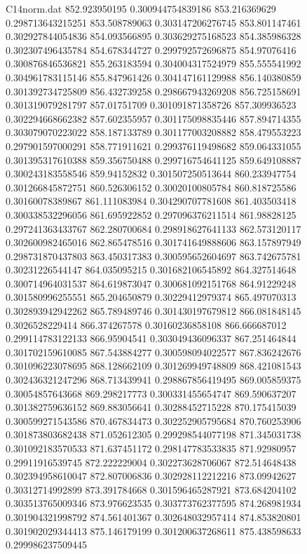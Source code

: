 \begin{filecontents}{C14norm.dat}
852.923950195			0.300944754839186
853.216369629			0.298713643215251
853.508789063			0.303147206276745
853.801147461			0.302927844054836
854.093566895			0.303629275168523
854.385986328			0.302307496435784
854.678344727			0.299792572696875
854.97076416			0.300876846536821
855.263183594			0.304004317524979
855.555541992			0.304961783115146
855.847961426			0.304147161129988
856.140380859			0.301392734725809
856.432739258			0.298667943269208
856.725158691			0.301319079281797
857.01751709			0.301091871358726
857.309936523			0.302294668662382
857.602355957			0.301175098835446
857.894714355			0.303079070223022
858.187133789			0.301177003208882
858.479553223			0.297901597000291
858.771911621			0.299376119498682
859.064331055			0.301395317610388
859.356750488			0.299716754641125
859.649108887			0.300243183558546
859.94152832			0.301507250513644
860.233947754			0.301266845872751
860.526306152			0.30020100805784
860.818725586			0.30160078389867
861.111083984			0.304290707781608
861.403503418			0.300338532296056
861.695922852			0.297096376211514
861.98828125			0.297241363433767
862.280700684			0.298918627641133
862.573120117			0.302600982465016
862.865478516			0.301741649888606
863.157897949			0.298731870437803
863.450317383			0.300595652604697
863.742675781			0.30231226544147
864.035095215			0.301682106545892
864.327514648			0.300714964031537
864.619873047			0.300681092151768
864.91229248			0.301580996255551
865.204650879			0.30229412979374
865.497070313			0.302893942942262
865.789489746			0.301430197679812
866.081848145			0.3026528229414
866.374267578			0.30160236858108
866.666687012			0.299114783122133
866.95904541			0.303049436096337
867.251464844			0.301702159610085
867.543884277			0.300598094022577
867.836242676			0.301096223078695
868.128662109			0.301269949748809
868.421081543			0.302436321247296
868.713439941			0.298867856419495
869.005859375			0.30054857643668
869.298217773			0.300331455654747
869.590637207			0.301382759636152
869.883056641			0.30288452715228
870.175415039			0.300599271543586
870.467834473			0.302252905795684
870.760253906			0.301873803682438
871.052612305			0.299298544077198
871.345031738			0.301092183570533
871.637451172			0.298147783533835
871.92980957			0.29911916539745
872.222229004			0.302273628706067
872.514648438			0.302394958610047
872.807006836			0.302928112212216
873.09942627			0.30312714992899
873.391784668			0.301596465287921
873.684204102			0.303513765009346
873.976623535			0.303773762377595
874.268981934			0.301904321998792
874.561401367			0.302648032957414
874.853820801			0.301902029344413
875.146179199			0.301200637268611
875.438598633			0.299986237509445

\end{filecontents}
